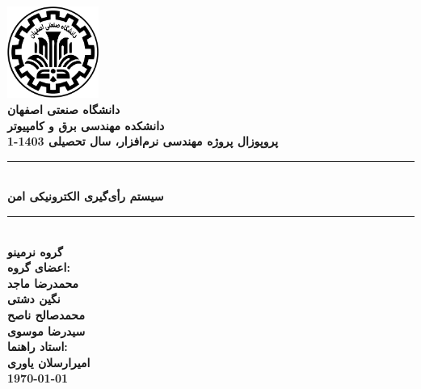 \documentclass[12pt]{article}
\begin{document}
\pagestyle{empty}
\begin{titlepage}
\begin{center}
\includegraphics[width=3cm]{logo.png} \\
{\fontsize{12}{12}\selectfont \bfseries دانشگاه صنعتی اصفهان}\\
{\fontsize{12}{12}\selectfont \bfseries دانشکده مهندسی برق و کامپیوتر}\\
\vspace{2cm}
{\fontsize{14}{14}\selectfont \bfseries پروپوزال پروژه مهندسی نرم‌افزار، سال تحصیلی 1403-1} \\[5mm]
{\textcolor{Blue}{\rule{\textwidth}{1mm}}}  \\
{\fontsize{24}{24}\selectfont \bfseries
سیستم رأی‌گیری الکترونیکی امن
}\\
{\textcolor{Blue}{\rule{\textwidth}{1mm}}}  \\
\vspace{1cm}
{\fontsize{18}{18}\selectfont \bfseries گروه نرمینو} \\[5mm]
{\fontsize{14}{14}\selectfont \bfseries اعضای گروه:} \\[3mm]
{\fontsize{16}{16}\selectfont \bfseries محمدرضا ماجد} \\
{\fontsize{16}{16}\selectfont \bfseries نگین دشتی } \\
{\fontsize{16}{16}\selectfont \bfseries محمدصالح ناصح  } \\
{\fontsize{16}{16}\selectfont \bfseries سیدرضا موسوی } \\
\vspace{1cm}
{\fontsize{14}{14}\selectfont \bfseries استاد راهنما: } \\[3mm]
{\fontsize{16}{16}\selectfont \bfseries امیرارسلان یاوری } \\
\vfill
{\fontsize{16}{16}\selectfont \bfseries\today}
\end{center}
\end{titlepage}
\clearpage
\tableofcontents
\clearpage
\pagestyle{fancy}
\lhead{}
\rhead{}
\end{document}
